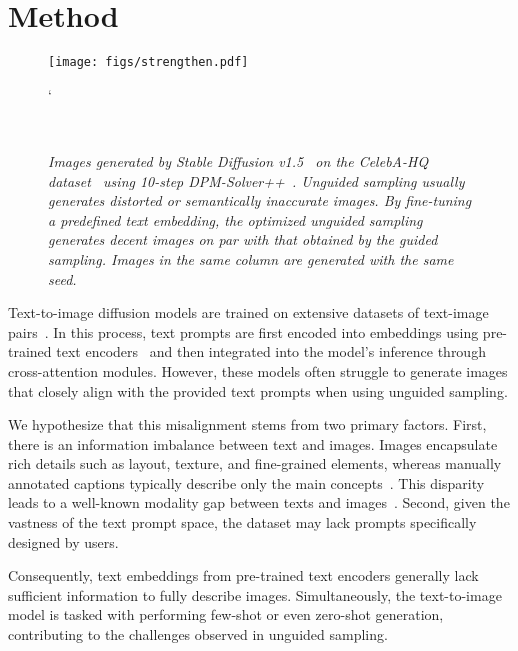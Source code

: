 \section{Method}
\label{sec:method}


\begin{figure}[t]
\centerline{\texttt{[image: figs/strengthen.pdf]}}
`\vspace{-2em}
\caption{\small \it Images generated 
by Stable Diffusion v1.5~\cite{rombach2022ldm} on the CelebA-HQ dataset~\cite{karras2017progressive} using 10-step DPM-Solver++~\cite{lu2022dpmpp}.
Unguided sampling usually generates distorted or semantically inaccurate images. By fine-tuning a predefined text embedding, the optimized unguided sampling generates decent images on par with that obtained by the guided sampling. Images in the same column are generated with the same seed.}
\label{fig:motivation}
 ~\vspace{-3em}
\end{figure}


Text-to-image diffusion models are trained on extensive datasets of text-image pairs~\cite{rombach2022ldm,podell2024sdxl,esser2024scaling}. In this process, text prompts are first encoded into embeddings using pre-trained text encoders~\cite{radford2021learning,raffel2020exploring} and then integrated into the model's inference through cross-attention modules. However, these models often struggle to generate images that closely align with the provided text prompts when using unguided sampling.

We hypothesize that this misalignment stems from two primary factors. First, there is an information imbalance between text and images. Images encapsulate rich details such as layout, texture, and fine-grained elements, whereas manually annotated captions typically describe only the main concepts~\cite{radford2021learning,schuhmann2022laion}. This disparity leads to a well-known modality gap between texts and images~\cite{liang2022mind,schrodi2024two}. Second, given the vastness of the text prompt space, the dataset may lack prompts specifically designed by users.

Consequently, text embeddings from pre-trained text encoders generally lack sufficient information to fully describe images. Simultaneously, the text-to-image model is tasked with performing few-shot or even zero-shot generation, contributing to the challenges observed in unguided sampling. 

